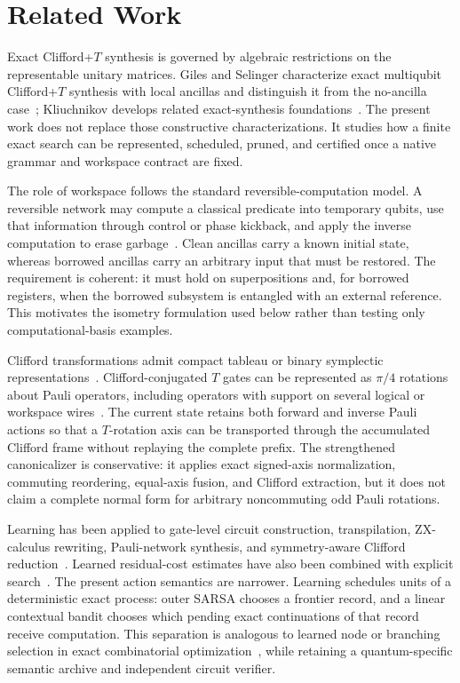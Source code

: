 \section{Related Work}

Exact Clifford+$T$ synthesis is governed by algebraic restrictions on the representable unitary matrices. Giles and Selinger characterize exact multiqubit Clifford+$T$ synthesis with local ancillas and distinguish it from the no-ancilla case~\cite{giles2013exact}; Kliuchnikov develops related exact-synthesis foundations~\cite{kliuchnikov2013synthesis}. The present work does not replace those constructive characterizations. It studies how a finite exact search can be represented, scheduled, pruned, and certified once a native grammar and workspace contract are fixed.

The role of workspace follows the standard reversible-computation model. A reversible network may compute a classical predicate into temporary qubits, use that information through control or phase kickback, and apply the inverse computation to erase garbage~\cite{nielsen2010quantum}. Clean ancillas carry a known initial state, whereas borrowed ancillas carry an arbitrary input that must be restored. The requirement is coherent: it must hold on superpositions and, for borrowed registers, when the borrowed subsystem is entangled with an external reference. This motivates the isometry formulation used below rather than testing only computational-basis examples.

Clifford transformations admit compact tableau or binary symplectic representations~\cite{aaronson2004improved,bravyi2021hadamard}. Clifford-conjugated $T$ gates can be represented as $\pi/4$ rotations about Pauli operators, including operators with support on several logical or workspace wires~\cite{zhang2019optimizing,vandaele2023optimal}. The current state retains both forward and inverse Pauli actions so that a $T$-rotation axis can be transported through the accumulated Clifford frame without replaying the complete prefix. The strengthened canonicalizer is conservative: it applies exact signed-axis normalization, commuting reordering, equal-axis fusion, and Clifford extraction, but it does not claim a complete normal form for arbitrary noncommuting odd Pauli rotations.

Learning has been applied to gate-level circuit construction, transpilation, ZX-calculus rewriting, Pauli-network synthesis, and symmetry-aware Clifford reduction~\cite{kolle2024environment,kremer2024practical,riu2023zx,dubal2025pauli,yeung2026equivariant}. Learned residual-cost estimates have also been combined with explicit search~\cite{theissinger2026beyond}. The present action semantics are narrower. Learning schedules units of a deterministic exact process: outer SARSA chooses a frontier record, and a linear contextual bandit chooses which pending exact continuations of that record receive computation. This separation is analogous to learned node or branching selection in exact combinatorial optimization~\cite{mattick2023node}, while retaining a quantum-specific semantic archive and independent circuit verifier.

